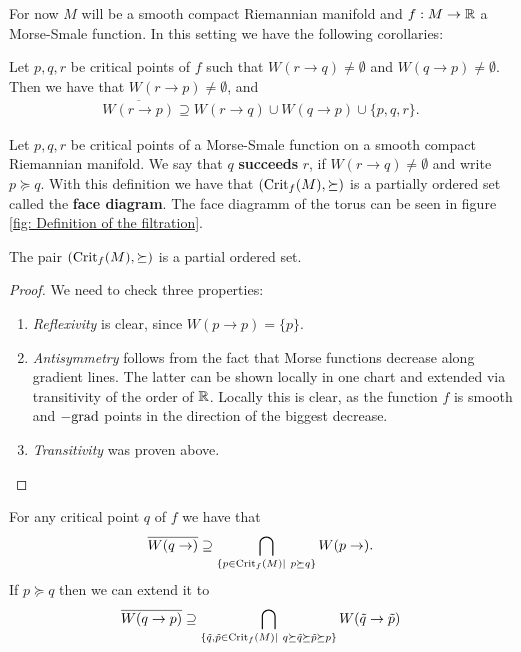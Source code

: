 For now $M$ will be a smooth compact Riemannian manifold and $f:M \to \mathbb{R}$ a Morse-Smale function. In this setting we have the following corollaries:
\begin{corollary} \label{cor: lambda lemma transitivity of critical points}
Let $p,q,r$ be critical points of $f$ such that $W(r \to q)\neq \emptyset$ and $W(q\to p) \neq \emptyset$. Then we have that $W(r \to p)\neq \emptyset$, and 
\begin{align*}
\overline{W(r \to p)}\supseteq W(r \to q)\cup W(q \to p) \cup \{p,q,r\}.
\end{align*} 
\end{corollary}
\begin{definition} Let $p,q,r$ be critical points of a Morse-Smale function on a smooth compact Riemannian manifold. We say that $q$ \textbf{succeeds} $r$, if $W(r \to q)\neq \emptyset$ and write $p\succeq q$. With this definition we have that $(\mathrm{Crit}_f(M),\succeq)$ is a partially ordered set called the \textbf{face diagram}. The face diagramm of the torus can be seen in figure \ref{fig: Definition of the filtration}.
\end{definition}
\begin{corollary}
The pair $(\mathrm{Crit}_f(M), \succeq)$ is a partial ordered set.
\end{corollary}
\begin{proof}
We need to check three properties:
\begin{enumerate}
\item \textit{Reflexivity} is clear, since $W(p \to p)=\{p\}$.
\item \textit{Antisymmetry} follows from the fact that Morse functions decrease along gradient lines. The latter can be shown locally in one chart and extended via transitivity of the order of $\mathbb{R}$. Locally this is clear, as the function $f$ is smooth and $-\mathrm{grad}$ points in the direction of the biggest decrease. 
\item \textit{Transitivity} was proven above.
\end{enumerate}
\end{proof}
\begin{corollary}\label{cor: lambda lemma corollary a} For any critical point $q$ of $f$ we have that
\begin{align*}
\overline{W(q\to)}\supseteq \bigcap_{\{p \in \mathrm{Crit}_f(M) | ~p \succeq q\}} W(p \to).
\end{align*} If $p \succeq q$ then we can extend it to
\begin{align*}
\overline{W(q \to p)}\supseteq \bigcap_{\{\tilde{q},\tilde{p} \in \mathrm{Crit}_f(M) |~ q \succeq \tilde{q} \succeq \tilde{p} \succeq p \} }W(\tilde{q} \to \tilde{p})
\end{align*}
\end{corollary}
